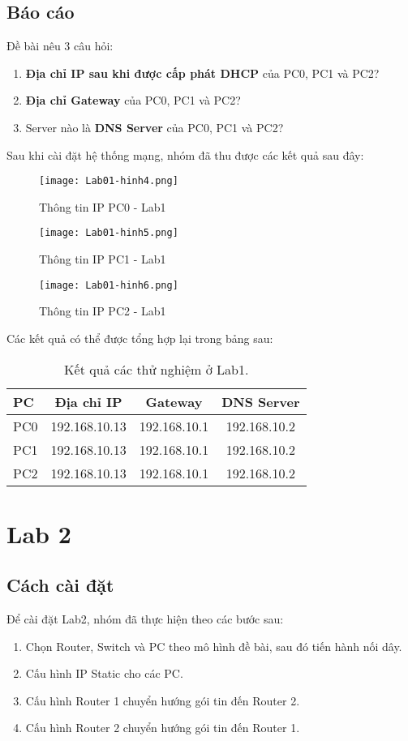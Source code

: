 \documentclass[]{article}
\begin{document}
\subsection{Báo cáo}
Đề bài nêu 3 câu hỏi:
\begin{enumerate}
    \item \textbf{Địa chỉ IP sau khi được cấp phát DHCP} của PC0, PC1 và PC2?
    \item \textbf{Địa chỉ Gateway} của PC0, PC1 và PC2?
    \item Server nào là \textbf{DNS Server} của PC0, PC1 và PC2?
\end{enumerate}
Sau khi cài đặt hệ thống mạng, nhóm đã thu được các kết quả sau đây:
\begin{figure}[H]
    \centering
    \texttt{[image: Lab01-hinh4.png]}
    \caption{Thông tin IP PC0 - Lab1}
\end{figure}
\begin{figure}[H]
    \centering
    \texttt{[image: Lab01-hinh5.png]}
    \caption{Thông tin IP PC1 - Lab1}
\end{figure}
\begin{figure}[H]
    \centering
    \texttt{[image: Lab01-hinh6.png]}
    \caption{Thông tin IP PC2 - Lab1}
\end{figure}
Các kết quả có thể được tổng hợp lại trong bảng sau:
\begin{table}[H]
    \centering
    \caption{Kết quả các thử nghiệm ở Lab1.}
    \begin{tabular}[t]{lccc}
        \toprule
        PC&Địa chỉ IP&Gateway&DNS Server\\
        \midrule
        PC0&192.168.10.13&192.168.10.1&192.168.10.2\\
        PC1&192.168.10.13&192.168.10.1&192.168.10.2\\
        PC2&192.168.10.13&192.168.10.1&192.168.10.2\\
        \bottomrule
    \end{tabular}
\end{table}

\section{Lab 2}
\subsection{Cách cài đặt}
Để cài đặt Lab2, nhóm đã thực hiện theo các bước sau:
\begin{enumerate}
\item Chọn Router, Switch và PC theo mô hình đề bài, sau đó tiến hành nối dây.
\item Cấu hình IP Static cho các PC.
\item Cấu hình Router 1 chuyển hướng gói tin đến Router 2.
\item Cấu hình Router 2 chuyển hướng gói tin đến Router 1.
\end{enumerate}
\end{document}
